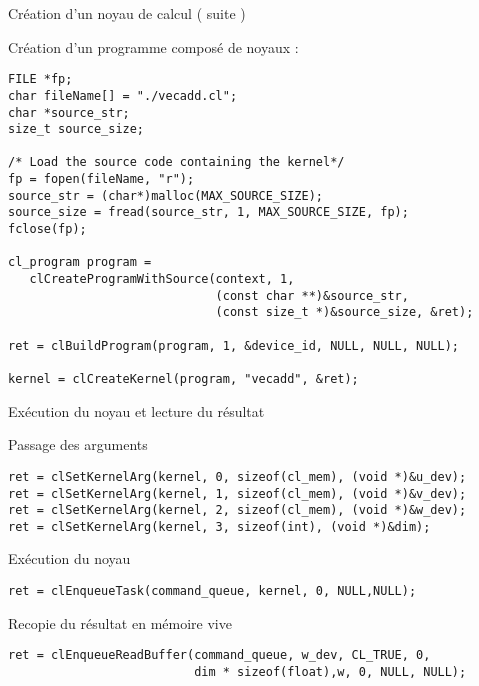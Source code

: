 \documentclass[handout,francais]{beamer}
\begin{document}
\begin{frame}[fragile]{Création d'un noyau de calcul ( suite )}
\begin{block}{Création d'un programme composé de noyaux :}
\begin{lstlisting}
FILE *fp;
char fileName[] = "./vecadd.cl";
char *source_str;
size_t source_size;
 
/* Load the source code containing the kernel*/
fp = fopen(fileName, "r");
source_str = (char*)malloc(MAX_SOURCE_SIZE);
source_size = fread(source_str, 1, MAX_SOURCE_SIZE, fp);
fclose(fp);
 
cl_program program = 
   clCreateProgramWithSource(context, 1, 
                             (const char **)&source_str,
                             (const size_t *)&source_size, &ret);
 
ret = clBuildProgram(program, 1, &device_id, NULL, NULL, NULL);
 
kernel = clCreateKernel(program, "vecadd", &ret);
\end{lstlisting}
\end{block}
\end{frame}

\begin{frame}[fragile]{Exécution du noyau et lecture du résultat}
\begin{block}{Passage des arguments}
\begin{lstlisting}
ret = clSetKernelArg(kernel, 0, sizeof(cl_mem), (void *)&u_dev);
ret = clSetKernelArg(kernel, 1, sizeof(cl_mem), (void *)&v_dev);
ret = clSetKernelArg(kernel, 2, sizeof(cl_mem), (void *)&w_dev);
ret = clSetKernelArg(kernel, 3, sizeof(int), (void *)&dim);
 \end{lstlisting}
 \end{block}
 
 \begin{block}{Exécution du noyau}
 \begin{lstlisting}
ret = clEnqueueTask(command_queue, kernel, 0, NULL,NULL);
\end{lstlisting}
 \end{block}
 
 \begin{block}{Recopie du résultat en mémoire vive}
 \begin{lstlisting}
ret = clEnqueueReadBuffer(command_queue, w_dev, CL_TRUE, 0,
                          dim * sizeof(float),w, 0, NULL, NULL);
\end{lstlisting}
\end{block}
\end{frame}
\end{document}
